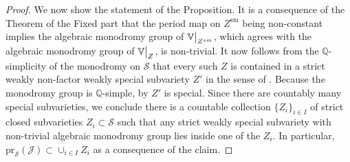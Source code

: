 \documentclass[letter, 11pt]{article}
\theoremstyle{plain}
\theoremstyle{definition}
\newcommand{\IQ}{\mathbb{Q}}
\newcommand{\IV}{\mathbb{V}}
\newcommand{\che}[1]{\widecheck{#1}}
\newcommand{\<}{\langle}
\renewcommand{\>}{\rangle}
\newcommand{\sS}{\mathcal{S}}
\newcommand\restr[2]{{
	\left.\kern-\nulldelimiterspace
	#1
	\vphantom{\big|}
	\right|_{#2}
	}}
\begin{document}
\begin{proof}

We now show the statement of the Proposition. It is a consequence of the Theorem of the Fixed part that the period map on $Z^{\textrm{sm}}$ being non-constant implies the algebraic monodromy group of $\restr{\IV}{Z^{\textrm{sm}}}$, which agrees with the algebraic monodromy group of $\restr{\IV}{Z}$, is non-trivial. It now follows from the $\IQ$-simplicity of the monodromy on $\sS$ that every such $Z$ is contained in a strict weakly non-factor weakly special subvariety $Z'$ in the sense of \cite[Def. 1.13]{FieldsDefHgLoci}. Because the monodromy group is $\mathbb{Q}$-simple, by \cite[Lem 2.5]{FieldsDefHgLoci} $Z'$ is special. Since there are countably many special subvarieties, we conclude there is a countable collection $\{ Z_{i} \}_{i \in I}$ of strict closed subvarieties $Z_{i} \subset \sS$ such that any strict weakly special subvariety with non-trivial algebraic monodromy group lies inside one of the $Z_{i}$. In particular, $\textrm{pr}_{\sS}(\mathcal{J}) \subset \cup_{i \in I} Z_{i}$ as a consequence of the claim. 



\end{proof}
\end{document}
